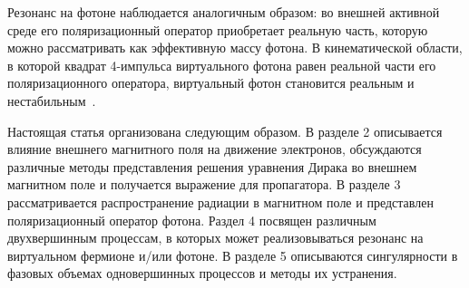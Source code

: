 Резонанс на фотоне наблюдается аналогичным образом: во внешней активной среде его поляризационный оператор приобретает реальную часть, которую можно рассматривать как эффективную массу фотона. В кинематической 
области, в которой квадрат 4-импульса виртуального фотона равен реальной части 
его поляризационного оператора, виртуальный фотон становится реальным и 
нестабильным~\cite{Rum:2013}.

Настоящая статья организована следующим образом. В разделе 2 описывается влияние внешнего магнитного поля на движение электронов, обсуждаются различные методы представления решения уравнения Дирака во внешнем магнитном поле и получается выражение для пропагатора. В разделе 3 рассматривается распространение радиации в магнитном поле и представлен поляризационный оператор фотона. Раздел 4 посвящен различным двухвершинным процессам, в которых может 
реализовываться резонанс на виртуальном фермионе и/или фотоне. В разделе 5 описываются сингулярности в фазовых объемах одновершинных процессов и методы их устранения.